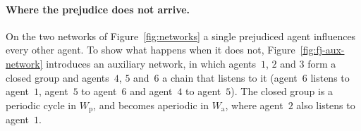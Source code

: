\paragraph{Where the prejudice does not arrive.}
On the two networks of Figure~\ref{fig:networks} a single prejudiced agent influences
every other agent.
 To show what happens when it does not, Figure~\ref{fig:fj-aux-network}
introduces an auxiliary network, in which agents~$1$, $2$ and $3$ form a closed group and
agents~$4$, $5$ and~$6$ a chain that listens to it (agent~$6$ listens to agent~$1$,
agent~$5$ to agent~$6$ and agent~$4$ to agent~$5$). The closed group is a periodic cycle
in $W_{\mathrm{p}}$, and becomes aperiodic in $W_{\mathrm{a}}$, where agent~$2$ also
listens to agent~$1$.

